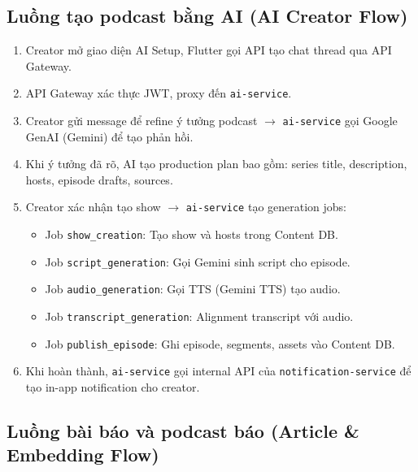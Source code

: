 \documentclass[14pt,a4paper,oneside]{extreport}
\begin{document}
\subsection{Luồng tạo podcast bằng AI (AI Creator Flow)}

\begin{enumerate}[leftmargin=2cm]
  \item Creator mở giao diện AI Setup, Flutter gọi API tạo chat thread qua API Gateway.
  \item API Gateway xác thực JWT, proxy đến \texttt{ai-service}.
  \item Creator gửi message để refine ý tưởng podcast $\rightarrow$ \texttt{ai-service} gọi Google GenAI (Gemini) để tạo phản hồi.
  \item Khi ý tưởng đã rõ, AI tạo production plan bao gồm: series title, description, hosts, episode drafts, sources.
  \item Creator xác nhận tạo show $\rightarrow$ \texttt{ai-service} tạo generation jobs:
    \begin{itemize}
      \item Job \texttt{show\_creation}: Tạo show và hosts trong Content DB.
      \item Job \texttt{script\_generation}: Gọi Gemini sinh script cho episode.
      \item Job \texttt{audio\_generation}: Gọi TTS (Gemini TTS) tạo audio.
      \item Job \texttt{transcript\_generation}: Alignment transcript với audio.
      \item Job \texttt{publish\_episode}: Ghi episode, segments, assets vào Content DB.
    \end{itemize}
  \item Khi hoàn thành, \texttt{ai-service} gọi internal API của \texttt{notification-service} để tạo in-app notification cho creator.
\end{enumerate}

\subsection{Luồng bài báo và podcast báo (Article \& Embedding Flow)}
\end{document}

